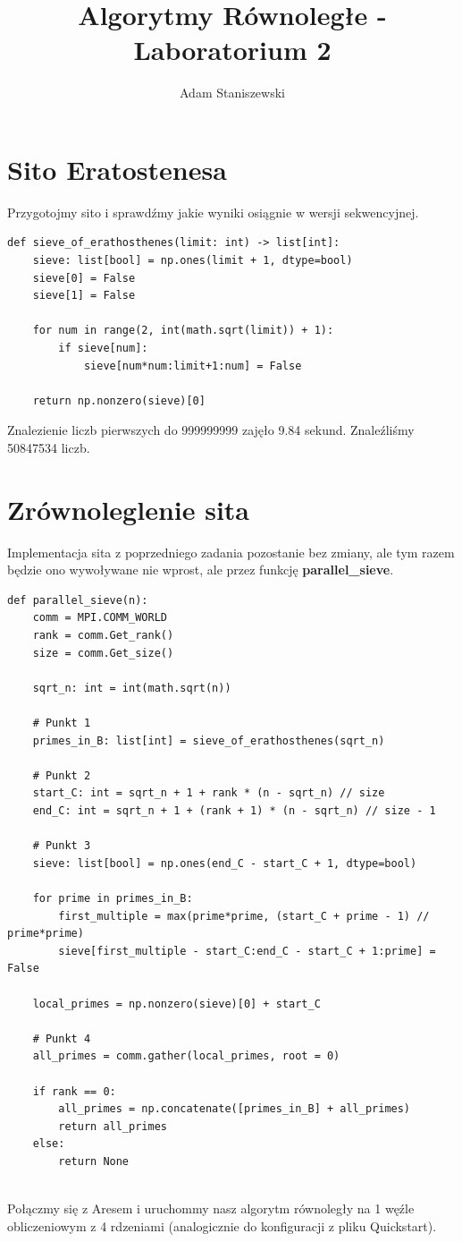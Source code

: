 \documentclass{article}
\title{Algorytmy Równoległe - Laboratorium 2}
\author{Adam Staniszewski}
\date{}
\begin{document}
\maketitle

\section*{Sito Eratostenesa}
Przygotojmy sito i sprawdźmy jakie wyniki osiągnie w wersji sekwencyjnej.

\begin{lstlisting}
def sieve_of_erathosthenes(limit: int) -> list[int]:
    sieve: list[bool] = np.ones(limit + 1, dtype=bool)
    sieve[0] = False
    sieve[1] = False

    for num in range(2, int(math.sqrt(limit)) + 1):
        if sieve[num]:
            sieve[num*num:limit+1:num] = False

    return np.nonzero(sieve)[0]
\end{lstlisting}
Znalezienie liczb pierwszych do 999999999 zajęło 9.84 sekund. Znaleźliśmy 50847534 liczb.

\section*{Zrównoleglenie sita}
Implementacja sita z poprzedniego zadania pozostanie bez zmiany, ale tym razem będzie ono wywoływane nie wprost, ale przez funkcję \textbf{parallel\_sieve}.

\begin{lstlisting}
def parallel_sieve(n):
    comm = MPI.COMM_WORLD
    rank = comm.Get_rank()
    size = comm.Get_size()

    sqrt_n: int = int(math.sqrt(n))

    # Punkt 1
    primes_in_B: list[int] = sieve_of_erathosthenes(sqrt_n)

    # Punkt 2
    start_C: int = sqrt_n + 1 + rank * (n - sqrt_n) // size
    end_C: int = sqrt_n + 1 + (rank + 1) * (n - sqrt_n) // size - 1

    # Punkt 3
    sieve: list[bool] = np.ones(end_C - start_C + 1, dtype=bool)

    for prime in primes_in_B:
        first_multiple = max(prime*prime, (start_C + prime - 1) // prime*prime)
        sieve[first_multiple - start_C:end_C - start_C + 1:prime] = False

    local_primes = np.nonzero(sieve)[0] + start_C

    # Punkt 4
    all_primes = comm.gather(local_primes, root = 0)

    if rank == 0:
        all_primes = np.concatenate([primes_in_B] + all_primes)
        return all_primes
    else:
        return None
 
\end{lstlisting}
Połączmy się z Aresem i uruchommy nasz algorytm równoległy na 1 węźle obliczeniowym z 4 rdzeniami (analogicznie do konfiguracji z pliku Quickstart). 
\end{document}
